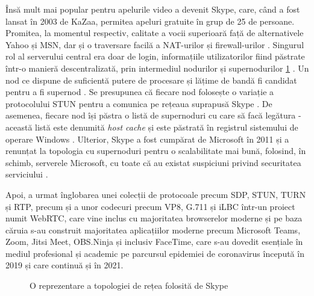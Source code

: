 \indent \par Însă mult mai popular pentru apelurile video a devenit Skype, care, când a fost lansat în 2003 de KaZaa, permitea apeluri gratuite în grup de 25 de persoane. Promitea, la momentul respectiv, calitate a vocii superioară față de alternativele Yahoo și MSN, dar și o traversare facilă a NAT-urilor și firewall-urilor \cite{Baset2004}. Singurul rol al serverului central era doar de login, informațiile utilizatorilor fiind păstrate într-o manieră descentralizată, prin intermediul nodurilor și supernodurilor \ref{SkypeNet} \cite{Baset2004}. Un nod ce dispune de suficientă putere de procesare și lățime de bandă fi candidat pentru a fi supernod \cite{Baset2004}. Se presupunea că fiecare nod folosește o variație a protocolului STUN pentru a comunica pe rețeaua suprapusă Skype \cite{Baset2004}. De asemenea, fiecare nod își păstra o listă de supernoduri cu care să facă legătura - această listă este denumită \textit{host cache} și este păstrată în registrul sistemului de operare Windows \cite{Baset2004}. Ulterior, Skype a fost cumpărat de Microsoft în 2011 și a renunțat la topologia cu supernoduri pentru o scalabilitate mai bună, folosind, în schimb, serverele Microsoft, cu toate că au existat suspiciuni privind securitatea serviciului \cite{Whittaker2013}.
\indent \par Apoi, a urmat înglobarea unei colecții de protocoale precum SDP, STUN, TURN și RTP, precum și a unor codecuri precum VP8, G.711 și iLBC într-un proiect numit WebRTC, care vine inclus cu majoritatea browserelor moderne și pe baza căruia s-au construit majoritatea aplicațiilor moderne precum Microsoft Teams, Zoom, Jitsi Meet, OBS.Ninja și inclusiv FaceTime, care s-au dovedit esențiale în mediul profesional și academic pe parcursul epidemiei de coronavirus începută în 2019 și care continuă și în 2021.
\begin{figure}
    \centering
    \scalebox{0.65}{}
    \caption{O reprezentare a topologiei de rețea folosită de Skype}
    \label{SkypeNet}
\end{figure}
